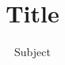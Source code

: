 
\newcommand{\metatitle}{Title}
\newcommand{\metabrief}{Brief}
\newcommand{\metasubject}{Subject}

\title[\metabrief]{\metatitle}
\subtitle{\metasubject}

\author{\metaauthor}
\institute{\metainstitute}
\date{\metadate}

\maketitle

